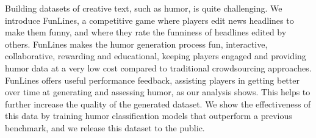 Building datasets of creative text, such as humor, is quite challenging. We introduce FunLines, a competitive game where players edit news headlines to make them funny, and where they rate the funniness of headlines edited by others. FunLines makes the humor generation process fun, interactive, collaborative, rewarding and educational, keeping players engaged and providing humor data at a very low cost compared to traditional crowdsourcing approaches. FunLines offers useful performance feedback, assisting players in getting better over time at generating and assessing humor, as our analysis shows. This helps to further increase the quality of the generated dataset. We show the effectiveness of this data by training humor classification models that outperform a previous benchmark, and we release this dataset to the public.
